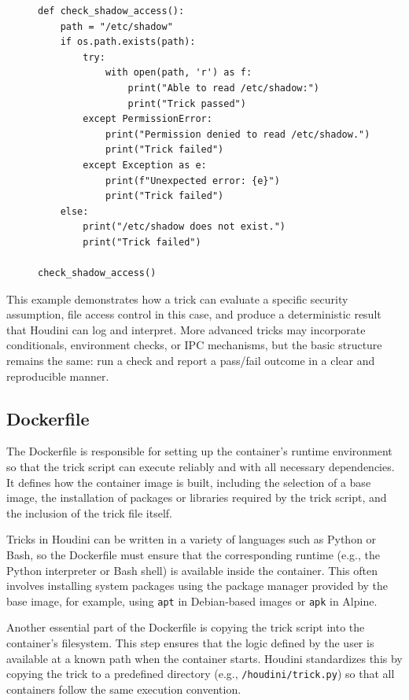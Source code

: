\documentclass[12pt]{report}
\begin{document}
\begin{doublespace}
\begin{figure}[H]
\begin{lstlisting}
def check_shadow_access():
    path = "/etc/shadow"
    if os.path.exists(path):
        try:
            with open(path, 'r') as f:
                print("Able to read /etc/shadow:")
                print("Trick passed")
        except PermissionError:
            print("Permission denied to read /etc/shadow.")
            print("Trick failed")
        except Exception as e:
            print(f"Unexpected error: {e}")
            print("Trick failed")
    else:
        print("/etc/shadow does not exist.")
        print("Trick failed")

check_shadow_access()
\end{lstlisting}
\end{figure}


This example demonstrates how a trick can evaluate a specific security assumption, file access control in this case, and produce a deterministic result that Houdini can log and interpret. More advanced tricks may incorporate conditionals, environment checks, or IPC mechanisms, but the basic structure remains the same: run a check and report a pass/fail outcome in a clear and reproducible manner.



\subsection{Dockerfile}

The Dockerfile is responsible for setting up the container's runtime environment so that the trick script can execute reliably and with all necessary dependencies. It defines how the container image is built, including the selection of a base image, the installation of packages or libraries required by the trick script, and the inclusion of the trick file itself.

Tricks in Houdini can be written in a variety of languages such as Python or Bash, so the Dockerfile must ensure that the corresponding runtime (e.g., the Python interpreter or Bash shell) is available inside the container. This often involves installing system packages using the package manager provided by the base image, for example, using \texttt{apt} in Debian-based images or \texttt{apk} in Alpine.

Another essential part of the Dockerfile is copying the trick script into the container's filesystem. This step ensures that the logic defined by the user is available at a known path when the container starts. Houdini standardizes this by copying the trick to a predefined directory (e.g., \texttt{/houdini/trick.py}) so that all containers follow the same execution convention.


\end{doublespace}
\end{document}
